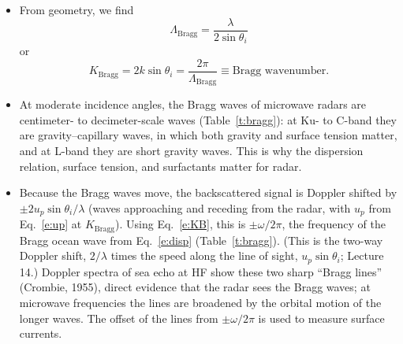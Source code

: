 \documentclass[11pt, oneside]{article}
\begin{document}
\begin{itemize}
	\item From geometry, we find
	\begin{equation}
		\label{e:LB}
		\Lambda_\mathrm{Bragg} = \frac{\lambda}{2\sin\theta_i}
	\end{equation}
	or
	\begin{equation}
		\label{e:KB}
		K_\mathrm{Bragg} = 2k\sin\theta_i = \frac{2\pi}{\Lambda_\mathrm{Bragg}} \equiv \text{Bragg wavenumber}.
	\end{equation}
	\item At moderate incidence angles, the Bragg waves of microwave radars are centimeter- to decimeter-scale waves (Table~\ref{t:bragg}): at Ku- to C-band they are gravity--capillary waves, in which both gravity and surface tension matter, and at L-band they are short gravity waves. This is why the dispersion relation, surface tension, and surfactants matter for radar.
	\item Because the Bragg waves move, the backscattered signal is Doppler shifted by $\pm2u_p\sin\theta_i/\lambda$ (waves approaching and receding from the radar, with $u_p$ from Eq.~\ref{e:up} at $K_\mathrm{Bragg}$). Using Eq.~\ref{e:KB}, this is $\pm\omega/2\pi$, the frequency of the Bragg ocean wave from Eq.~\ref{e:disp} (Table~\ref{t:bragg}). (This is the two-way Doppler shift, $2/\lambda$ times the speed along the line of sight, $u_p\sin\theta_i$; Lecture 14.) Doppler spectra of sea echo at HF show these two sharp ``Bragg lines'' (Crombie, 1955), direct evidence that the radar sees the Bragg waves; at microwave frequencies the lines are broadened by the orbital motion of the longer waves. The offset of the lines from $\pm\omega/2\pi$ is used to measure surface currents.
\end{itemize}
\end{document}
